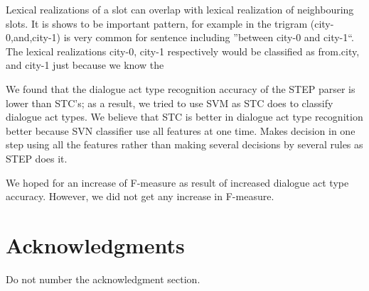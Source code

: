 \documentclass[11pt]{article}
\begin{document}
Lexical realizations of a slot can overlap with lexical realization of neighbouring slots. It is shows to be important pattern, for example in the trigram (city-0,and,city-1) is very common for sentence including ''between city-0 and city-1``. The lexical realizations city-0, city-1 respectively would be classified as from.city, and city-1 just because we know the  


We found that the dialogue act type recognition accuracy of the STEP parser is lower than STC's; as a result, we tried to use SVM as STC does to classify dialogue act types. We believe that STC is better in dialogue act type recognition better because SVN classifier use all features at one time. Makes decision in one step using all the features rather than making several decisions by several rules as STEP does it.

We hoped for an increase of F-measure as result of increased dialogue act type accuracy. However, we did not get any increase in F-measure.
 
\section*{Acknowledgments}

Do not number the acknowledgment section.
\end{document}
